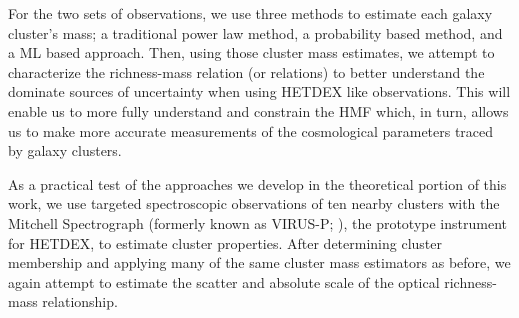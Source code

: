 For the two sets of observations, we use three methods to estimate each galaxy cluster's mass; a traditional power law method, a probability based method, and a ML based approach. Then, using those cluster mass estimates, we attempt to characterize the richness-mass relation (or relations) to better understand the dominate sources of uncertainty when using HETDEX like observations. This will enable us to more fully understand and constrain the HMF which, in turn, allows us to make more accurate measurements of the cosmological parameters traced by galaxy clusters.

As a practical test of the approaches we develop in the theoretical portion of this work, we use targeted spectroscopic observations of ten nearby clusters with the Mitchell Spectrograph (formerly known as VIRUS-P; \citealt{Hill2008a}), the prototype instrument for HETDEX, to estimate cluster properties. After determining cluster membership and applying many of the same cluster mass estimators as before, we again attempt to estimate the scatter and absolute scale of the optical richness-mass relationship.
